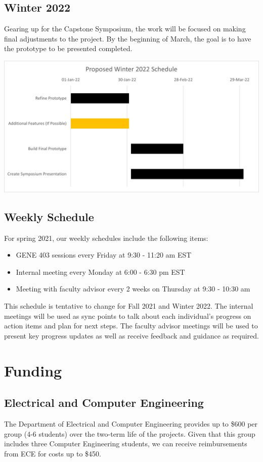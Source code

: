 \documentclass[a4paper,11pt]{article}
\begin{document}
\subsection{Winter 2022}
Gearing up for the Capstone Symposium, the work will be focused on making final adjustments to the project. By the beginning of March, the goal is to have the prototype to be presented completed.
\begin{center}
\includegraphics[scale=0.8]{W22.png}
\end{center}

\subsection{Weekly Schedule}
For spring 2021, our weekly schedules include the following items:
\begin{itemize}
    \item GENE 403 sessions every Friday at 9:30 - 11:20 am EST
    \item Internal meeting every Monday at 6:00 - 6:30 pm EST
    \item Meeting with faculty advisor every 2 weeks on Thursday at 9:30 - 10:30 am
\end{itemize}

\noindent
This schedule is tentative to change for Fall 2021 and Winter 2022. The internal meetings will be used as sync points to talk about each individual's progress on action items and plan for next steps. The faculty advisor meetings will be used to present key progress updates as well as receive feedback and guidance as required.

\section{Funding}
\subsection{Electrical and Computer Engineering}
The Department of Electrical and Computer Engineering provides up to \$600 per group (4-6 students) over the two-term life of the projects. Given that this group includes three Computer Engineering students, we can receive reimbursements from ECE for costs up to \$450.
\end{document}

